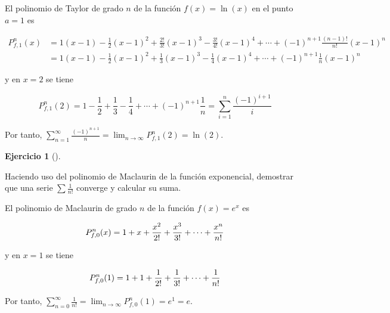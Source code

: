 \documentclass[
  spanish,
  a4paper,
]{scrreport}
\theoremstyle{definition}
\newtheorem{exercise}{Ejercicio}[chapter]
\theoremstyle{remark}
\begin{document}
\begin{tcolorbox}[enhanced jigsaw, arc=.35mm, bottomrule=.15mm, bottomtitle=1mm, breakable, colback=white, colbacktitle=quarto-callout-tip-color!10!white, colframe=quarto-callout-tip-color-frame, coltitle=black, left=2mm, leftrule=.75mm, opacityback=0, opacitybacktitle=0.6, rightrule=.15mm, title=\textcolor{quarto-callout-tip-color}{\faLightbulb}\hspace{0.5em}{Solución}, titlerule=0mm, toprule=.15mm, toptitle=1mm]

El polinomio de Taylor de grado \(n\) de la función \(f(x)=\ln(x)\) en
el punto \(a=1\) es

\begin{align*}
P^n_{f,1}(x) &= 1(x-1) - \frac{1}{2}(x-1)^2 + \frac{2!}{3!}(x-1)^3 - \frac{3!}{4!} (x-1)^4 + \cdots + (-1)^{n+1}\frac{(n-1)!}{n!}(x-1)^n \\ 
&= 1(x-1) -\frac{1}{2}(x-1)^2 + \frac{1}{3}(x-1)^3 - \frac{1}{4} (x-1)^4 + \cdots + (-1)^{n+1}\frac{1}{n}(x-1)^n 
\end{align*}

y en \(x=2\) se tiene

\[
P^n_{f,1}(2) = 1 -\frac{1}{2} + \frac{1}{3} - \frac{1}{4} + \cdots + (-1)^{n+1}\frac{1}{n} = \sum_{i=1}^n \frac{(-1)^{i+1}}{i} 
\]

Por tanto,
\(\sum_{n=1}^\infty \frac{(-1)^{n+1}}{n} = \lim_{n\to\infty}P^n_{f,1}(2) = \ln(2)\).

\end{tcolorbox}

\begin{exercise}[]\protect\hypertarget{exr-serie-exponencial}{}\label{exr-serie-exponencial}

Haciendo uso del polinomio de Maclaurin de la función exponencial,
demostrar que una serie \(\sum \frac{1}{n!}\) converge y calcular su
suma.

\end{exercise}

\begin{tcolorbox}[enhanced jigsaw, arc=.35mm, bottomrule=.15mm, bottomtitle=1mm, breakable, colback=white, colbacktitle=quarto-callout-tip-color!10!white, colframe=quarto-callout-tip-color-frame, coltitle=black, left=2mm, leftrule=.75mm, opacityback=0, opacitybacktitle=0.6, rightrule=.15mm, title=\textcolor{quarto-callout-tip-color}{\faLightbulb}\hspace{0.5em}{Solución}, titlerule=0mm, toprule=.15mm, toptitle=1mm]

El polinomio de Maclaurin de grado \(n\) de la función \(f(x)=e^x\) es

\[
P^n_{f,0}(x) = 1 + x + \frac{x^2}{2!} + \frac{x^3}{3!} + \cdots + \frac{x^n}{n!}\\ 
\]

y en \(x=1\) se tiene

\[
P^n_{f,0}(1) = 1 + 1 + \frac{1}{2!} + \frac{1}{3!} + \cdots + \frac{1}{n!}\\ 
\]

Por tanto,
\(\sum_{n=0}^\infty \frac{1}{n!} = \lim_{n\to\infty}P^n_{f,0}(1) = e^1 = e.\)

\end{tcolorbox}
\end{document}
